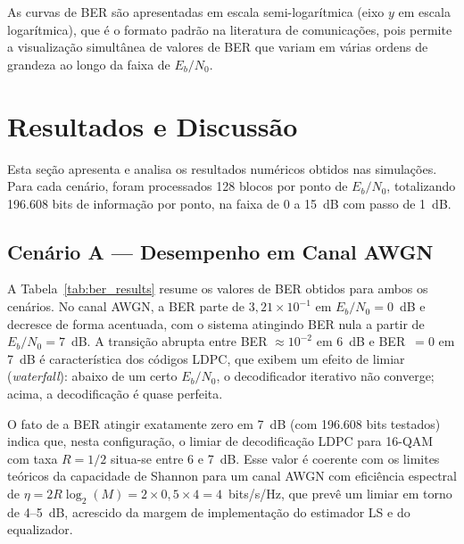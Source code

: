 \documentclass[conference]{IEEEtran}
\begin{document}
As curvas de BER são apresentadas em escala semi-logarítmica (eixo $y$ em escala logarítmica), que é o formato padrão na literatura de comunicações, pois permite a visualização simultânea de valores de BER que variam em várias ordens de grandeza ao longo da faixa de $E_b/N_0$.

\section{Resultados e Discussão}

Esta seção apresenta e analisa os resultados numéricos obtidos nas simulações. Para cada cenário, foram processados 128 blocos por ponto de $E_b/N_0$, totalizando 196.608 bits de informação por ponto, na faixa de 0 a 15~dB com passo de 1~dB.

\subsection{Cenário A --- Desempenho em Canal AWGN}

A Tabela~\ref{tab:ber_results} resume os valores de BER obtidos para ambos os cenários. No canal AWGN, a BER parte de $3{,}21 \times 10^{-1}$ em $E_b/N_0 = 0$~dB e decresce de forma acentuada, com o sistema atingindo BER nula a partir de $E_b/N_0 = 7$~dB. A transição abrupta entre BER $\approx 10^{-2}$ em 6~dB e BER~$= 0$ em 7~dB é característica dos códigos LDPC, que exibem um efeito de limiar (\textit{waterfall}): abaixo de um certo $E_b/N_0$, o decodificador iterativo não converge; acima, a decodificação é quase perfeita.

O fato de a BER atingir exatamente zero em 7~dB (com 196.608 bits testados) indica que, nesta configuração, o limiar de decodificação LDPC para 16-QAM com taxa $R = 1/2$ situa-se entre 6 e 7~dB. Esse valor é coerente com os limites teóricos da capacidade de Shannon para um canal AWGN com eficiência espectral de $\eta = 2R \log_2(M) = 2 \times 0{,}5 \times 4 = 4$~bits/s/Hz, que prevê um limiar em torno de 4--5~dB, acrescido da margem de implementação do estimador LS e do equalizador.
\end{document}

